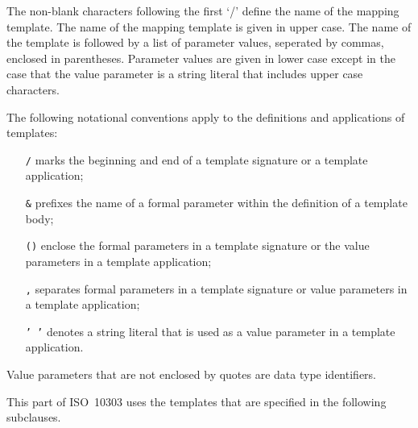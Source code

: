 
    The non-blank characters following the first `/' define the name of
the mapping template. The name of the mapping template is given in
upper case. The name of the template is followed by a list of parameter
values, seperated by commas, enclosed in parentheses. Parameter values
are given in lower case except in the case that the value parameter
is a string literal that includes upper case characters.

    The following notational conventions apply to the definitions and
applications of templates:

\begin{itemize}

\item[\texttt{/}] marks the beginning and end of a template signature or a
         template application;
\item[\texttt{\&}] prefixes the name of a formal parameter within the definition
          of a template body;
\item[\texttt{()}] enclose the formal parameters in a template signature or the
          value parameters in a template application;
\item[\texttt{,}] separates formal parameters in a template signature or
          value parameters in a template application;
\item[\texttt{' '}] denotes a string literal that is used as a value parameter
          in a template application.

\end{itemize}

    Value parameters that are not enclosed by quotes are \Express{} data type
identifiers.

    This part of ISO~10303 uses the templates that are specified in the
following subclauses.

\endinput
